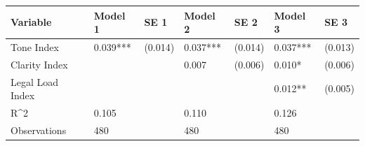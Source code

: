 \begin{tabular}{lllllll}
\toprule
Variable & Model 1 & SE 1 & Model 2 & SE 2 & Model 3 & SE 3 \\
\midrule
Tone Index & 0.039*** & (0.014) & 0.037*** & (0.014) & 0.037*** & (0.013) \\
Clarity Index &  &  & 0.007 & (0.006) & 0.010* & (0.006) \\
Legal Load Index &  &  &  &  & 0.012** & (0.005) \\
R^2 & 0.105 &  & 0.110 &  & 0.126 &  \\
Observations & 480 &  & 480 &  & 480 &  \\
\bottomrule
\end{tabular}
